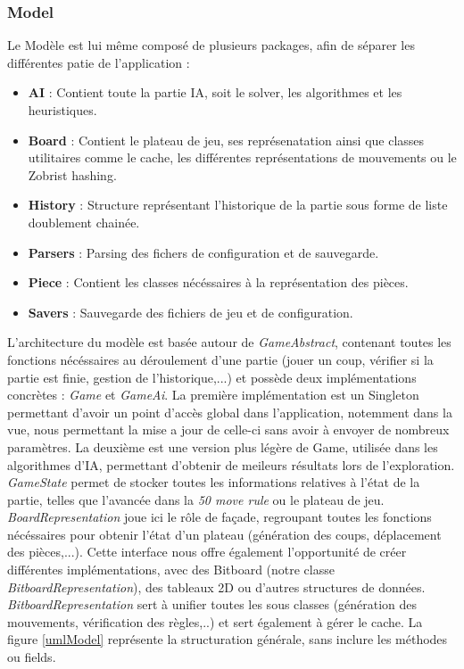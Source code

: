 \documentclass{article}
\begin{document}
\subsubsection{Model}
Le Modèle est lui même composé de plusieurs packages, afin de séparer les différentes patie de l'application :
\begin{itemize}
    \item \textbf{AI} : Contient toute la partie IA, soit le solver, les algorithmes et les heuristiques.
    \item \textbf{Board} : Contient le plateau de jeu, ses représenatation ainsi que classes utilitaires comme le cache, 
    les différentes représentations de mouvements ou le Zobrist hashing.
    \item \textbf{History} : Structure représentant l'historique de la partie sous forme de liste doublement chainée.
    \item \textbf{Parsers} : Parsing des fichers de configuration et de sauvegarde.
    \item \textbf{Piece} : Contient les classes nécéssaires à la représentation des pièces.
    \item \textbf{Savers} : Sauvegarde des fichiers de jeu et de configuration.
\end{itemize}

L'architecture du modèle est basée autour de \textit{GameAbstract}, contenant toutes les fonctions nécéssaires au déroulement d'une partie 
(jouer un coup, vérifier si la partie est finie, gestion de l'historique,...) et possède deux implémentations concrètes : \textit{Game} et \textit{GameAi}.
La première implémentation est un Singleton permettant d'avoir un point d'accès global dans l'application, notemment dans la vue, nous permettant la mise a jour de celle-ci sans avoir à envoyer de nombreux paramètres.
La deuxième est une version plus légère de Game, utilisée dans les algorithmes d'IA, permettant d'obtenir de meileurs résultats lors de l'exploration.
\textit{GameState} permet de stocker toutes les informations relatives  à l'état de la partie, telles que l'avancée dans la \textit{50 move rule} ou le plateau de jeu.
\textit{BoardRepresentation} joue ici le rôle de façade, regroupant toutes les fonctions nécéssaires pour obtenir l'état d'un plateau (génération des coups, déplacement des pièces,...).
Cette interface nous offre également l'opportunité de créer différentes implémentations, avec des Bitboard (notre classe \textit{BitboardRepresentation}), des tableaux 2D ou d'autres structures de données.
\textit{BitboardRepresentation} sert à unifier toutes les sous classes (génération des mouvements, vérification des règles,..) et sert également à gérer le cache.
La figure \ref{umlModel} représente la structuration générale, sans inclure les méthodes ou fields.
\end{document}
